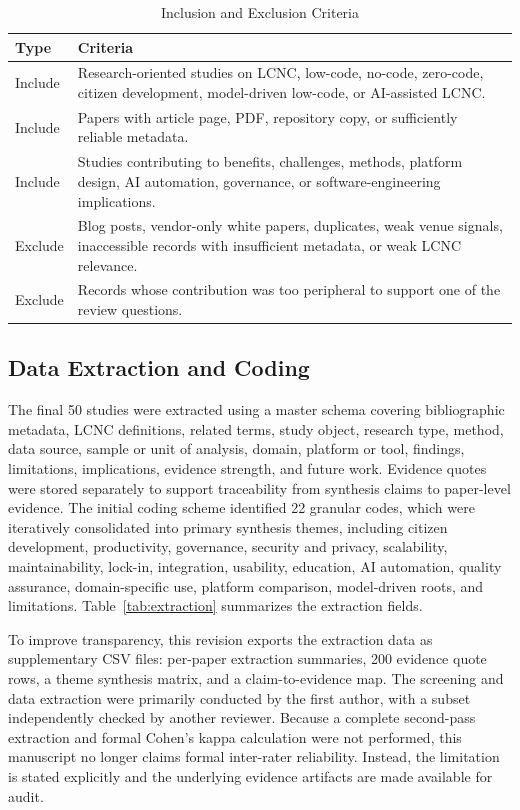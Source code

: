 \documentclass[conference]{IEEEtran}
\begin{document}
\begin{table}[t]
\centering
\caption{Inclusion and Exclusion Criteria}
\label{tab:criteria}
\scriptsize
\begin{tabularx}{\columnwidth}{p{}X}
\toprule
Type & Criteria \\
\midrule
Include & Research-oriented studies on LCNC, low-code, no-code, zero-code, citizen development, model-driven low-code, or AI-assisted LCNC. \\
Include & Papers with article page, PDF, repository copy, or sufficiently reliable metadata. \\
Include & Studies contributing to benefits, challenges, methods, platform design, AI automation, governance, or software-engineering implications. \\
Exclude & Blog posts, vendor-only white papers, duplicates, weak venue signals, inaccessible records with insufficient metadata, or weak LCNC relevance. \\
Exclude & Records whose contribution was too peripheral to support one of the review questions. \\
\bottomrule
\end{tabularx}
\end{table}

\subsection{Data Extraction and Coding}
The final 50 studies were extracted using a master schema covering bibliographic metadata, LCNC definitions, related terms, study object, research type, method, data source, sample or unit of analysis, domain, platform or tool, findings, limitations, implications, evidence strength, and future work. Evidence quotes were stored separately to support traceability from synthesis claims to paper-level evidence. The initial coding scheme identified 22 granular codes, which were iteratively consolidated into primary synthesis themes, including citizen development, productivity, governance, security and privacy, scalability, maintainability, lock-in, integration, usability, education, AI automation, quality assurance, domain-specific use, platform comparison, model-driven roots, and limitations. Table~\ref{tab:extraction} summarizes the extraction fields.

To improve transparency, this revision exports the extraction data as supplementary CSV files: per-paper extraction summaries, 200 evidence quote rows, a theme synthesis matrix, and a claim-to-evidence map. The screening and data extraction were primarily conducted by the first author, with a subset independently checked by another reviewer. Because a complete second-pass extraction and formal Cohen's kappa calculation were not performed, this manuscript no longer claims formal inter-rater reliability. Instead, the limitation is stated explicitly and the underlying evidence artifacts are made available for audit.
\end{document}
